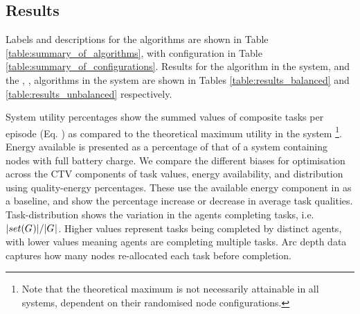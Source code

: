 \subsection{Results}
Labels and descriptions for the algorithms are shown in Table \ref{table:summary_of_algorithms}, with configuration in Table \ref{table:summary_of_configurations}. Results for the \algorithmBalanced{}{} algorithm in the \simulationSimple{}{} system, and the \algorithmEnergy{}{}, \algorithmQuality{}{}, \algorithmDistribution{}{} algorithms in the \simulationExtended{}{} system are shown in Tables \ref{table:results_balanced} and \ref{table:results_unbalanced} respectively.

System utility percentages show the summed values of composite tasks per episode (Eq. \label{eq:system_utility}) as compared to the theoretical maximum utility in the system \footnote{Note that the theoretical maximum is not necessarily attainable in all systems, dependent on their randomised node configurations.}. Energy available is presented as a percentage of that of a system containing nodes with full battery charge. We compare the different biases for optimisation across the CTV components of task values, energy availability, and distribution using quality-energy percentages. These use the available energy component in as a baseline, and show the percentage increase or decrease in average task qualities. Task-distribution shows the variation in the agents completing tasks, i.e. $\lvert set(G_{}^{}) \rvert{}/\lvert G_{}^{} \rvert{}$. Higher values represent tasks being completed by distinct agents, with lower values meaning agents are completing multiple tasks. Arc depth data captures how many nodes re-allocated each task before completion.